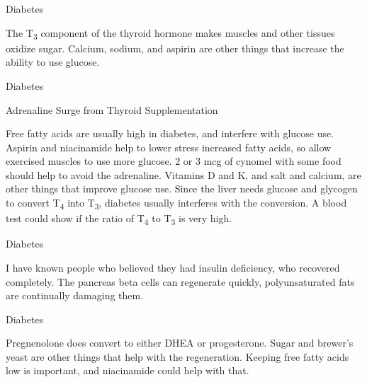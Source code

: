 \documentclass[11pt,oneside,openany,extrafontsizes]{memoir}
\begin{document}
\begin{standalonequote}{Diabetes}

    \begin{answer}
        The T\textsubscript{3} component of the thyroid hormone makes muscles and other tissues oxidize sugar. Calcium, sodium, and aspirin are other things that increase the ability to use glucose.
    \end{answer}
\end{standalonequote}

\begin{standalonequote}{Diabetes}
    \begin{note}
        Adrenaline Surge from Thyroid Supplementation
    \end{note}

    \begin{answer}
        Free fatty acids are usually high in diabetes, and interfere with glucose use. Aspirin and niacinamide help to lower stress increased fatty acids, so allow exercised muscles to use more glucose. 2 or 3 mcg of cynomel with some food should help to avoid the adrenaline. Vitamins D and K, and salt and calcium, are other things that improve glucose use. Since the liver needs glucose and glycogen to convert T\textsubscript{4} into T\textsubscript{3}, diabetes usually interferes with the conversion. A blood test could show if the ratio of T\textsubscript{4} to T\textsubscript{3} is very high.
    \end{answer}
\end{standalonequote}

\begin{standalonequote}{Diabetes}

    \begin{answer}
        I have known people who believed they had insulin deficiency, who recovered completely. The pancreas beta cells can regenerate quickly, polyunsaturated fats are continually damaging them.
    \end{answer}
\end{standalonequote}

\begin{standalonequote}{Diabetes}

    \begin{answer}
        Pregnenolone does convert to either DHEA or progesterone. Sugar and brewer's yeast are other things that help with the regeneration. Keeping free fatty acids low is important, and niacinamide could help with that.
    \end{answer}
\end{standalonequote}
\end{document}
